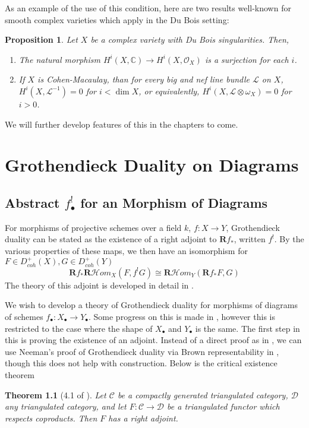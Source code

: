 \documentclass[proquest]{uwthesis}[2014/11/13]
\newtheorem{theorem}{Theorem}[section]
\newtheorem{prop}[theorem]{Proposition}
\theoremstyle{definition}
\newcommand{\cHom}{\mathcal{H} \textit{om}}
\newcommand{\CC}{\mathbb{C}}
\newcommand{\CL}{\mathcal{C}}
\newcommand{\DD}{\mathcal{D}}
\newcommand{\LL}{\mathcal{L}}
\newcommand{\OO}{\mathcal{O}}
\newcommand{\bR}{\textbf{R}}
\begin{document}
As an example of the use of this condition, here are two results well-known for smooth complex varieties which apply in the Du Bois setting:

\begin{prop}
	Let $X$ be a complex variety with Du Bois singularities.
	Then,
	\begin{enumerate}
		\item The natural morphism $H^i(X, \CC) \rightarrow H^i(X, \OO_X)$ is a surjection for each $i$.
		\item If $X$ is Cohen-Macaulay, than for every big and nef line bundle $\LL$ on $X$, $H^i(X, \LL^{-1}) = 0$ for $i < \dim X$, or equivalently, $H^i(X, \LL \otimes \omega_X) = 0$ for $i > 0$.
	\end{enumerate}
\end{prop}

We will further develop features of this in the chapters to come.

\chapter{Grothendieck Duality on Diagrams}
\label{chp:grothendieckduality}

\section{Abstract $f_\bullet^!$ for an Morphism of Diagrams}
For morphisms of projective schemes over a field $k$, $f : X \rightarrow Y$, Grothendieck duality can be stated as the existence of a right adjoint to $\bR f_*$, written $f^!$.
By the various properties of these maps, we then have an isomorphism for $F \in D_{coh}^+(X), G \in D_{coh}^+(Y)$
\[
\bR f_* \bR \cHom_X(F, f^! G) \cong \bR \cHom_Y(\bR f_* F, G)
\]
The theory of this adjoint is developed in detail in \cite{Hartshorne1966}.

We wish to develop a theory of Grothendieck duality for morphisms of diagrams of schemes $f_\bullet : X_\bullet \rightarrow Y_\bullet$.
Some progress on this is made in \cite{Lipman2009}, however this is restricted to the case where the shape of $X_\bullet$ and $Y_\bullet$ is the same.
The first step in this is proving the existence of an adjoint.
Instead of a direct proof as in \cite{Hartshorne1966}, we can use Neeman's proof of Grothendieck duality via Brown representability in \cite{Neeman1996}, though this does not help with construction.
Below is the critical existence theorem

\begin{theorem}[4.1 of \cite{Neeman1996}]
	\label{thm:neeman4.1}
	Let $\CL$ be a compactly generated triangulated category, $\DD$ any triangulated category, and let $F : \CL \rightarrow \DD$ be a triangulated functor which respects coproducts.
	Then $F$ has a right adjoint.
\end{theorem}
\end{document}
